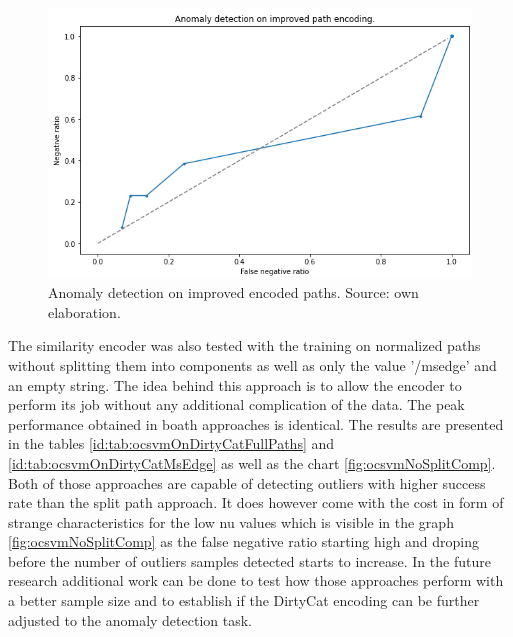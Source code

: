 \documentclass[a4paper,twoside,12pt]{book}
\begin{document}
\begin{figure}
	\centering
	\includegraphics[scale=0.9]{images/OcsvmOnDirtyCatGood}
	\caption{Anomaly detection on improved encoded paths. Source: own elaboration.}
	\label{fig:ocsvmOnDirtyCatGood}
 \end{figure}

The similarity encoder was also tested with the training on normalized paths without splitting 
them into components as well as only the value '/msedge' and an empty string. The idea behind this approach
is to allow the encoder to perform its job without any additional complication of the data. The peak performance obtained in
boath approaches is identical. The results are presented in the tables \ref{id:tab:ocsvmOnDirtyCatFullPaths} 
and \ref{id:tab:ocsvmOnDirtyCatMsEdge} as well as the chart \ref{fig:ocsvmNoSplitComp}. Both of those approaches
are capable of detecting outliers with higher success rate than the split path approach. It does
however come with the cost in form of strange characteristics for the low nu values which is visible in the graph \ref{fig:ocsvmNoSplitComp}
as the false negative ratio starting high and droping before the number of outliers samples detected starts to increase.
In the future research additional work can be done to test how those approaches perform with a better sample size and to
establish if the DirtyCat encoding can be further adjusted to the anomaly detection task.
\end{document}

